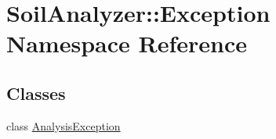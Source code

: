 \hypertarget{namespace_soil_analyzer_1_1_exception}{}\section{Soil\+Analyzer\+:\+:Exception Namespace Reference}
\label{namespace_soil_analyzer_1_1_exception}
\subsection*{Classes}
\begin{DoxyCompactItemize}
\item 
class \hyperlink{class_soil_analyzer_1_1_exception_1_1_analysis_exception}{Analysis\+Exception}
\end{DoxyCompactItemize}
